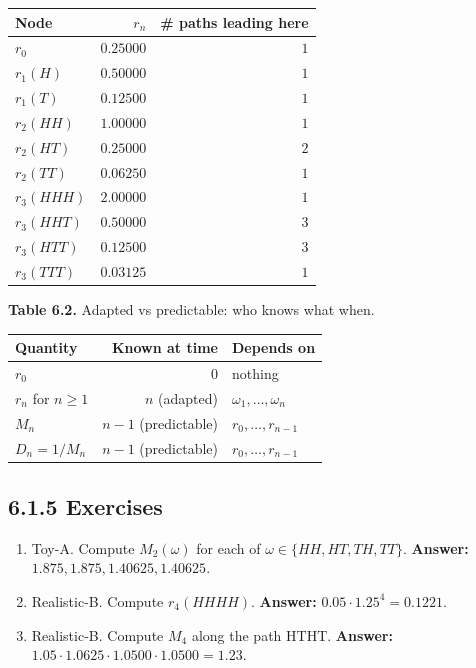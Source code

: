 \documentclass[
  10pt,
  twoside]{book}
\newcounter{none} %
\providecommand{\tightlist}{%
  \setlength{\itemsep}{0pt}\setlength{\parskip}{0pt}}
\begin{document}
{\def\LTcaptype{none} %
\begin{table}[H]
\centering
\begin{tabular}{|l|r|r|}
\toprule
Node & \(r_n\) & \# paths leading here \\
\midrule



\(r_0\) & \(0.25000\) & \(1\) \\
\(r_1(H)\) & \(0.50000\) & \(1\) \\
\(r_1(T)\) & \(0.12500\) & \(1\) \\
\(r_2(HH)\) & \(1.00000\) & \(1\) \\
\(r_2(HT)\) & \(0.25000\) & \(2\) \\
\(r_2(TT)\) & \(0.06250\) & \(1\) \\
\(r_3(HHH)\) & \(2.00000\) & \(1\) \\
\(r_3(HHT)\) & \(0.50000\) & \(3\) \\
\(r_3(HTT)\) & \(0.12500\) & \(3\) \\
\(r_3(TTT)\) & \(0.03125\) & \(1\) \\
\bottomrule
\end{tabular}
\end{table}
}

\textbf{Table 6.2.} Adapted vs predictable: who knows what when.

{\def\LTcaptype{none} %
\begin{table}[H]
\centering
\begin{tabular}{|l|r|l|}
\toprule
Quantity & Known at time & Depends on \\
\midrule



\(r_0\) & \(0\) & nothing \\
\(r_n\) for \(n \ge 1\) & \(n\) (adapted) &
\(\omega_1, \ldots, \omega_n\) \\
\(M_n\) & \(n - 1\) (predictable) & \(r_0, \ldots, r_{n-1}\) \\
\(D_n = 1/M_n\) & \(n - 1\) (predictable) & \(r_0, \ldots, r_{n-1}\) \\
\bottomrule
\end{tabular}
\end{table}
}

\subsection{6.1.5 Exercises}\label{exercises-27}

\begin{enumerate}
\def\labelenumi{\arabic{enumi}.}
\tightlist
\item
  Toy-A. Compute \(M_2(\omega)\) for each of
  \(\omega \in \{HH, HT, TH, TT\}\). \textbf{Answer:}
  \(1.875, 1.875, 1.40625, 1.40625\).
\item
  Realistic-B. Compute \(r_4(HHHH)\). \textbf{Answer:}
  \(0.05 \cdot 1.25^4 = 0.1221\).
\item
  Realistic-B. Compute \(M_4\) along the path HTHT. \textbf{Answer:}
  \(1.05 \cdot 1.0625 \cdot 1.0500 \cdot 1.0500 = 1.23\).
\end{enumerate}
\end{document}

